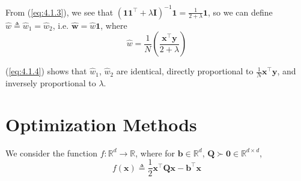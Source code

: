 \documentclass{article}
\numberwithin{equation}{section}
\begin{document}
From (\ref{eq:4.1.3}), we see that $ \left(\mathbf{11}^\top +
\lambda\mathbf{I}\right)^{-1}\mathbf{1} = \frac{1}{2 + \lambda}\mathbf{1} $,
so we can define $ \hat{w} \triangleq \hat{w}_1 = \hat{w}_2 $, i.e.
$ \hat{\mathbf{w}} = \hat{w}\mathbf{1} $, where
\begin{equation} \label{eq:4.1.4}
    \hat{w} =
    \frac{1}{N}\left(\frac{\mathbf{x}^\top\mathbf{y}}{2 + \lambda}\right)
\end{equation}

(\ref{eq:4.1.4}) shows that $ \hat{w}_1 $, $ \hat{w}_2 $ are identical,
directly proportional to $ \frac{1}{N}\mathbf{x}^\top\mathbf{y} $, and
inversely proportional to $ \lambda $.

\section{Optimization Methods}


We consider the function $ f : \mathbb{R}^d \rightarrow \mathbb{R} $, where
for $ \mathbf{b} \in \mathbb{R}^d $, $ \mathbf{Q} \succ \mathbf{0} \in
\mathbb{R}^{d \times d} $,
\begin{equation} \label{eq:5.1.1}
    f(\mathbf{x}) \triangleq
    \frac{1}{2}\mathbf{x}^\top\mathbf{Qx} - \mathbf{b}^\top\mathbf{x}
\end{equation}
\end{document}
